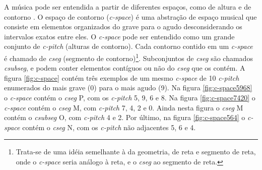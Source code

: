 \documentclass[brazil]{article}
\newcommand{\termo}[1]{\textit{#1}}
\begin{document}
A música pode ser entendida a partir de diferentes espaços, como de
altura e de contorno \cite{morris87:composition}. O espaço de contorno
(\termo{c-space}) é uma abstração de espaço musical que consiste em
elementos organizados do grave para o agudo desconsiderando os
intervalos exatos entre eles. O \termo{c-space} pode ser entendido
como um grande conjunto de \termo{c-pitch} (alturas de contorno). Cada
contorno contido em um \termo{c-space} é chamado de \termo{cseg}
(segmento de contorno)\footnote{Trata-se de uma idéia semelhante à da
  geometria, de reta e segmento de reta, onde o \termo{c-space} seria
  análogo à reta, e o \termo{cseg} ao segmento de reta.}. Subconjuntos
de \termo{cseg} são chamados \termo{csubseg}, e podem conter elementos
contíguos ou não do \termo{cseg} que os contém. A figura
\ref{fig:c-space} contém três exemplos de um mesmo \termo{c-space} de
10 \termo{c-pitch} enumerados do mais grave (0) para o mais agudo
(9). Na figura \ref{fig:c-space5968} o \termo{c-space} contém o
\termo{cseg} P, com os \termo{c-pitch} 5, 9, 6 e 8. Na figura
\ref{fig:c-space7420} o \termo{c-space} contém o \termo{cseg} M, com
\termo{c-pitch} 7, 4, 2 e 0. Ainda nesta figura o \termo{cseg} M
contém o \termo{csubseg} O, com \termo{c-pitch} 4 e 2. Por último, na
figura \ref{fig:c-space564} o \termo{c-space} contém o \termo{cseg} N,
com os \termo{c-pitch} não adjacentes 5, 6 e 4.
\end{document}

